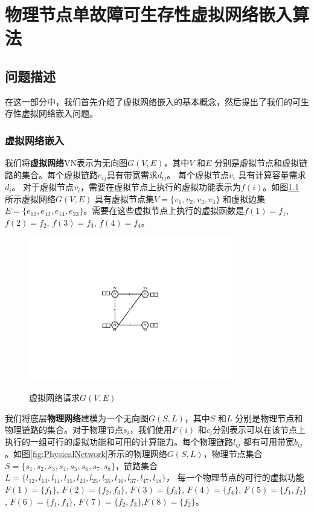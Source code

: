 \chapter{物理节点单故障可生存性虚拟网络嵌入算法}
\section{问题描述}
在这一部分中，我们首先介绍了虚拟网络嵌入的基本概念，然后提出了我们的可生存性虚拟网络嵌入问题。
\subsection{虚拟网络嵌入}
我们将\textbf{虚拟网络}VN表示为无向图$G (V,E)$，其中$V$ 和$E$ 分别是虚拟节点和虚拟链路的集合。每个虚拟链路$e_{ij}$具有带宽需求$d_{ij}$。 每个虚拟节点$v_i$ 具有计算容量需求$d_i$。 对于虚拟节点$v_i$，需要在虚拟节点上执行的虚拟功能表示为$f(i)$。如图\ref{fig:VirtualNetworkRequest} 所示虚拟网络$G (V,E)$ 具有虚拟节点集$V=\{v_1,v_2,v_3,v_4\}$ 和虚拟边集$E= \{e_{12},e_{13},e_{14},e_{23}\}$。需要在这些虚拟节点上执行的虚拟函数是$f(1)=f_1$, $f(2)=f_2$, $f(3)=f_3$, $f(4)=f_4$。

\begin{figure}[htb]
\centering
\includegraphics[width=3.5in]{figures/VirtualNetworkRequest}\\
\caption{虚拟网络请求$G(V,E)$
}\label{fig:VirtualNetworkRequest}
\end{figure}

我们将底层\textbf{物理网络}建模为一个无向图$G (S,L)$，其中$S$ 和$L$ 分别是物理节点和物理链路的集合。对于物理节点$s_i$，我们使用$F(i)$ 和$c_i$分别表示可以在该节点上执行的一组可行的虚拟功能和可用的计算能力。每个物理链路$l_{ij}$ 都有可用带宽$b_{ij}$。如图\ref{fig:PhysicalNetwork}所示的物理网络$G (S,L)$，物理节点集合$S=\{s_1,s_2,s_3,s_4,s_5,s_6,s_7,s_8\}$，链路集合$L=\{l_{12},l_{13},l_{14},l_{15},l_{23},l_{25},l_{35},l_{36},l_{37},l_{47},l_{58}\}$，
每一个物理节点的可行的虚拟功能$F(1)=\{f_1\}$, $F(2)=\{f_2,f_3\}$, $F(3)=\{f_3\}$, $F(4)=\{f_4\}$, $F(5)=\{f_1,f_2\}$, $F(6)=\{f_1,f_4\}$, $F(7)=\{f_2,f_3\}$,$F(8)=\{f_2\}$。

